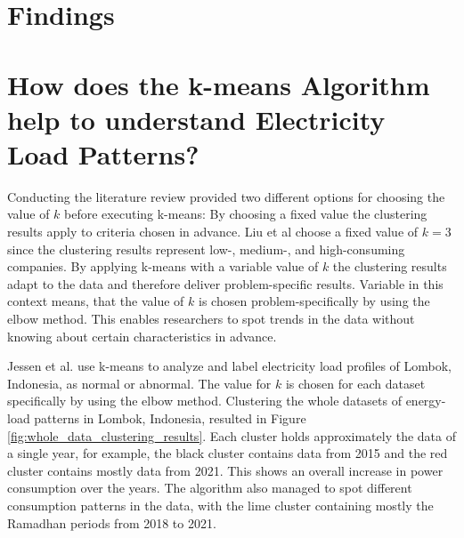 \section{Findings}
\label{cha:findings}



\section{How does the k-means Algorithm help to understand Electricity Load Patterns?}
\label{sec:findings_understand_electricity_load_patterns}
Conducting the literature review provided two different options for choosing the value of $k$ before executing k-means:
By choosing a fixed value the clustering results apply to criteria chosen in advance.
Liu et al \cite{LIU-BDE} choose a fixed value of $k=3$ since the clustering results represent low-, medium-, and high-consuming companies.
By applying k-means with a variable value of $k$ the clustering results adapt to the data and therefore deliver problem-specific results.
Variable in this context means, that the value of $k$ is chosen problem-specifically by using the elbow method.
This enables researchers to spot trends in the data without knowing about certain characteristics in advance.

Jessen et al. \cite{JES-IND} use k-means to analyze and label electricity load profiles of Lombok, Indonesia, as normal or abnormal.
The value for $k$ is chosen for each dataset specifically by using the elbow method.
Clustering the whole datasets of energy-load patterns in Lombok, Indonesia, resulted in Figure \ref{fig:whole_data_clustering_results}.
Each cluster holds approximately the data of a single year, for example, the black cluster contains data from 2015 and the red cluster contains mostly data from 2021.
This shows an overall increase in power consumption over the years.
The algorithm also managed to spot different consumption patterns in the data, with the lime cluster containing mostly the Ramadhan periods from 2018 to 2021.

